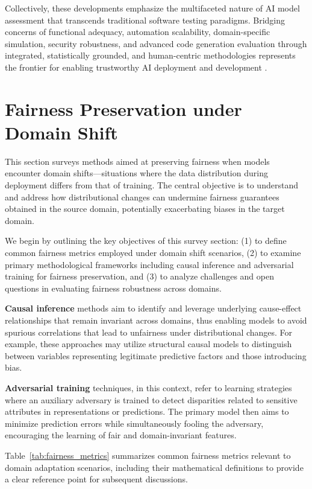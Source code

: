 \documentclass[sigconf]{acmart}
\begin{document}
Collectively, these developments emphasize the multifaceted nature of AI model assessment that transcends traditional software testing paradigms. Bridging concerns of functional adequacy, automation scalability, domain-specific simulation, security robustness, and advanced code generation evaluation through integrated, statistically grounded, and human-centric methodologies represents the frontier for enabling trustworthy AI deployment and development \cite{ref1,ref2,ref3,ref9,ref27,ref29,ref30,ref31,ref32}.

\section{Fairness Preservation under Domain Shift}

This section surveys methods aimed at preserving fairness when models encounter domain shifts—situations where the data distribution during deployment differs from that of training. The central objective is to understand and address how distributional changes can undermine fairness guarantees obtained in the source domain, potentially exacerbating biases in the target domain.

We begin by outlining the key objectives of this survey section: (1) to define common fairness metrics employed under domain shift scenarios, (2) to examine primary methodological frameworks including causal inference and adversarial training for fairness preservation, and (3) to analyze challenges and open questions in evaluating fairness robustness across domains.

\textbf{Causal inference} methods aim to identify and leverage underlying cause-effect relationships that remain invariant across domains, thus enabling models to avoid spurious correlations that lead to unfairness under distributional changes. For example, these approaches may utilize structural causal models to distinguish between variables representing legitimate predictive factors and those introducing bias.

\textbf{Adversarial training} techniques, in this context, refer to learning strategies where an auxiliary adversary is trained to detect disparities related to sensitive attributes in representations or predictions. The primary model then aims to minimize prediction errors while simultaneously fooling the adversary, encouraging the learning of fair and domain-invariant features.

Table~\ref{tab:fairness_metrics} summarizes common fairness metrics relevant to domain adaptation scenarios, including their mathematical definitions to provide a clear reference point for subsequent discussions.
\end{document}
